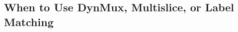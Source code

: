 \documentclass[11pt, letterpaper]{article}
\begin{document}
\subsection{When to Use DynMux, Multislice, or Label Matching}
\end{document}
